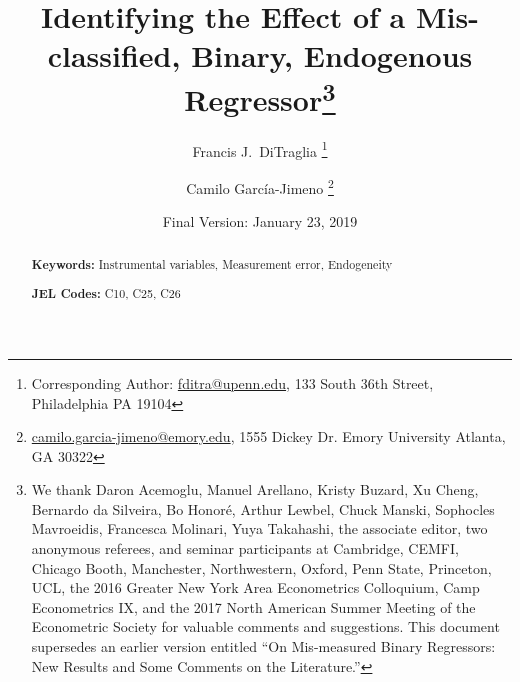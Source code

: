 \documentclass[12pt]{article}
\title{Identifying the Effect of a Mis-classified, Binary, Endogenous Regressor\thanks{We thank Daron Acemoglu, Manuel Arellano, Kristy Buzard, Xu Cheng, Bernardo da Silveira, Bo Honor\'{e}, Arthur Lewbel, Chuck Manski, Sophocles Mavroeidis, Francesca Molinari, Yuya Takahashi, the associate editor, two anonymous referees, and seminar participants at Cambridge, CEMFI, Chicago Booth, Manchester, Northwestern, Oxford, Penn State, Princeton, UCL, the 2016 Greater New York Area Econometrics Colloquium, Camp Econometrics IX, and the 2017 North American Summer Meeting of the Econometric Society for valuable comments and suggestions. This document supersedes an earlier version entitled ``On Mis-measured Binary Regressors: New Results and Some Comments on the Literature.''}}
\author[1]{Francis J.\ DiTraglia \thanks{Corresponding Author: \href{mailto:fditra@upenn.edu}{fditra@upenn.edu}, 133 South 36th Street, Philadelphia PA 19104}}
\author[2,3]{Camilo Garc\'{i}a-Jimeno \thanks{\href{mailto:camilo.garcia-jimeno@emory.edu}{camilo.garcia-jimeno@emory.edu}, 1555 Dickey Dr.
Emory University
Atlanta, GA 30322}}
\affil[1]{\normalsize Department of Economics, University of Pennsylvania}
\affil[2]{\normalsize Institute for Quantitative Theory and Methods, Emory University}
\affil[3]{\normalsize NBER}
\date{\small Final Version: January 23, 2019}
\theoremstyle{definition}
\theoremstyle{definition}
\theoremstyle{remark}
\theoremstyle{plain}
\begin{document}
\clearpage
\maketitle
\thispagestyle{empty}

\begin{abstract}
  \singlespacing
	

  	\bigskip
	\noindent\textbf{Keywords:} Instrumental variables, Measurement error, Endogeneity

	\medskip
  \noindent\textbf{JEL Codes:} C10, C25, C26
\end{abstract}

\newpage
\setcounter{page}{1}

\singlespacing





\appendix
{}
\singlespacing \small





\small


\normalsize
\end{document}
